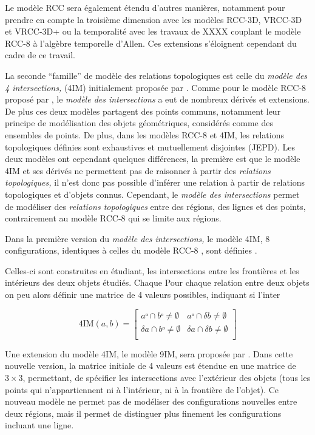 Le modèle RCC sera également étendu d'autres manières, notamment pour
prendre en compte la troisième dimension avec les modèles RCC-3D,
VRCC-3D et VRCC-3D+ ou la temporalité avec les travaux de XXXX
couplant le modèle RCC-8 à l'algèbre temporelle d'Allen. Ces
extensions s'éloignent cependant du cadre de ce travail.

La seconde \enquote{famille} de modèle des relations topologiques est
celle du \emph{modèle des 4 intersections,} (4IM) initialement
proposée par \textcite{Egenhofer1989}. Comme pour le modèle RCC-8
proposé par \textcite{Randell1992}, le \emph{modèle des intersections}
a eut de nombreux dérivés et extensions. De plus ces deux modèles
partagent des points communs, notamment leur principe de modélisation
des objets géométriques, considérés comme des ensembles de points. De
plus, dans les modèles RCC-8 \autocite{Randell1992} et 4IM, les
relations topologiques définies sont exhaustives et mutuellement
disjointes (JEPD). Les deux modèles ont cependant quelques
différences, la première est que le modèle 4IM et ses dérivés ne
permettent pas de raisonner à partir des \emph{relations
  topologiques,} il n'est donc pas possible d'inférer une relation à
partir de relations topologiques et d'objets connus. Cependant, le
\emph{modèle des intersections} permet de modéliser des
\emph{relations topologiques} entre des régions, des lignes et des
points, contrairement au modèle RCC-8 qui se limite aux régions.

Dans la première version du \emph{modèle des intersections,} le modèle
4IM, 8 configurations, identiques à celles du modèle RCC-8
\autocite{Duchene2019}, sont définies \textcite{Egenhofer1989}.

Celles-ci sont construites en étudiant, les
intersections entre les frontières et les intérieurs des deux objets
étudiés. Chaque Pour chaque relation entre deux objets on peu alors
définir une matrice de 4 valeurs possibles, indiquant si l'inter

\begin{equation}
  \label{eq:matrice_4IM}
  \text{4IM}(a,b) =
  \begin{bmatrix}
    aᵒ ∩ bᵒ ≠ ∅ & aᵒ ∩ δb ≠ ∅ \\
    δa ∩ bᵒ ≠ ∅ & δa ∩ δb ≠ ∅ \\
  \end{bmatrix}
\end{equation}

Une extension du modèle 4IM, le modèle 9IM, sera proposée par
\textcite{Egenhofer1991}. Dans cette nouvelle version, la matrice
initiale de 4 valeurs est étendue en une matrice de \(3 × 3\),
permettant, de spécifier les intersections avec l'extérieur des objets
(\ie tous les points qui n'appartiennent ni à l'intérieur, ni à la
frontière de l'objet). Ce nouveau modèle ne permet pas de modéliser
des configurations nouvelles entre deux régions, mais il permet de
distinguer plus finement les configurations incluant une ligne.

